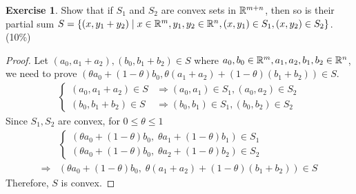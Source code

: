 \documentclass[12pt]{extarticle}
\theoremstyle{definition}
\newtheorem{exercise}{Exercise}
\begin{document}
\begin{exercise}
  Show that if $S_1$ and $S_2$ are convex sets in $\mathbb{R}^{m+n}$, then so is their partial sum $S=\{(x,y_1+y_2)\mid x\in\mathbb{R}^m,y_1,y_2\in\mathbb{R}^n,(x,y_1)\in S_1,(x,y_2)\in S_2\}$. (10\%)
\end{exercise}
\begin{proof}
  Let $(a_0, a_1+a_2), (b_0, b_1+b_2)\in S$ where $a_0, b_0\in\mathbb{R}^m, a_1, a_2, b_1, b_2\in\mathbb{R}^n$, we need to prove $(\theta a_0+(1-\theta)b_0, \theta (a_1+a_2)+(1-\theta)(b_1+b_2))\in S$.
  \begin{align*}
    \begin{cases}
      (a_0, a_1+a_2)\in S&\Rightarrow (a_0, a_1)\in S_1, (a_0, a_2)\in S_2\\
      (b_0, b_1+b_2)\in S&\Rightarrow (b_0, b_1)\in S_1, (b_0, b_2)\in S_2
    \end{cases}
  \end{align*}
  Since $S_1, S_2$ are convex, for $0\le\theta\le 1$
  \begin{align*}
    &\begin{cases}
      (\theta a_0+(1-\theta)b_0,\;\theta a_1+(1-\theta)b_1)\in S_1\\
      (\theta a_0+(1-\theta)b_0,\;\theta a_2+(1-\theta)b_2)\in S_2
    \end{cases}\\
    \Rightarrow &(\theta a_0+(1-\theta)b_0,\;\theta (a_1+a_2)+(1-\theta)(b_1+b_2))\in S
  \end{align*}
  Therefore, $S$ is convex.
\end{proof}
\end{document}
